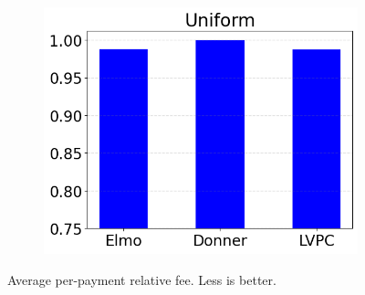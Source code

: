 \begin{figure}
\begin{subfigure}{.3293\textwidth}
  \includegraphics[width=\textwidth]{../simulation/Fees_uniform.png}
  \end{subfigure}
  \caption{Average per-payment relative fee. Less is better.}
  \label{graph:fees}
  \end{figure}
